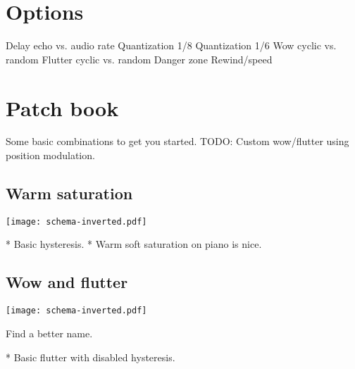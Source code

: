 \documentclass[11pt]{article}
\begin{document}
\section{Options}

Delay echo vs. audio rate
Quantization 1/8
Quantization 1/6
Wow cyclic vs. random
Flutter cyclic vs. random
Danger zone
Rewind/speed

\newpage

\section{Patch book}

Some basic combinations to get you started. TODO: Custom wow/flutter using position modulation.

\vspace{5mm}
\noindent
\begin{minipage}[t]{0.45\textwidth}

\subsection{Warm saturation}

\vspace{5mm}
\begin{center}
  \texttt{[image: schema-inverted.pdf]}
\end{center}

* Basic hysteresis.
* Warm soft saturation on piano is nice.

\lipsum[1][1-2]
\end{minipage}%
\begin{minipage}{0.05\textwidth}
\phantom{ }
\end{minipage}%
\begin{minipage}[t]{0.45\textwidth}
\subsection{Wow and flutter}

\vspace{5mm}
\begin{center}
  \texttt{[image: schema-inverted.pdf]}
\end{center}

Find a better name.

* Basic flutter with disabled hysteresis.
\end{minipage}

\newpage
\end{document}
